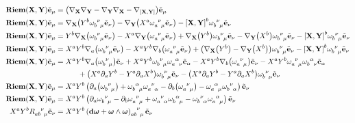 \begin{align*}
    \textbf{Riem}\qty(\vb X,\vb Y)\tilde{\vb e}_\mu&=\qty(\nabla_{\vb X}\nabla_{\vb Y}-\nabla_{\vb Y}\nabla_{\vb X}-\nabla_{\comm{\vb X}{\vb Y}})\tilde{\vb e}_\mu\\
    \textbf{Riem}\qty(\vb X,\vb Y)\tilde{\vb e}_\mu&=\nabla_{\vb X}\qty(Y^b\tensor{\omega}{_b^\nu_\mu}\tilde{\vb e}_\nu)-\nabla_{\vb Y}\qty(X^a\tensor{\omega}{_a^\nu_\mu}\tilde{\vb e}_\nu)-\comm{\vb X}{\vb Y}^b\tensor{\omega}{_b^\nu_\mu}\tilde{\vb e}_\nu\\
    \textbf{Riem}\qty(\vb X,\vb Y)\tilde{\vb e}_\mu&=Y^b\nabla_{\vb X}\qty(\tensor{\omega}{_b^\nu_\mu}\tilde{\vb e}_\nu)-X^a\nabla_{\vb Y}\qty(\tensor{\omega}{_a^\nu_\mu}\tilde{\vb e}_\nu)+\nabla_{\vb X}\qty(Y^b)\tensor{\omega}{_b^\nu_\mu}\tilde{\vb e}_\nu-\nabla_{\vb Y}\qty(X^b)\tensor{\omega}{_b^\nu_\mu}\tilde{\vb e}_\nu-\comm{\vb X}{\vb Y}^b\tensor{\omega}{_b^\nu_\mu}\tilde{\vb e}_\nu\\
    \textbf{Riem}\qty(\vb X,\vb Y)\tilde{\vb e}_\mu&=X^aY^b\nabla_{a}\qty(\tensor{\omega}{_b^\nu_\mu}\tilde{\vb e}_\nu)-X^aY^b\nabla_{b}\qty(\tensor{\omega}{_a^\nu_\mu}\tilde{\vb e}_\nu)+\qty(\nabla_{\vb X}\qty(Y^b)-\nabla_{\vb Y}\qty(X^b))\tensor{\omega}{_b^\nu_\mu}\tilde{\vb e}_\nu-\comm{\vb X}{\vb Y}^b\tensor{\omega}{_b^\nu_\mu}\tilde{\vb e}_\nu\\
    \textbf{Riem}\qty(\vb X,\vb Y)\tilde{\vb e}_\mu&=X^aY^b\nabla_{a}\qty(\tensor{\omega}{_b^\nu_\mu})\tilde{\vb e}_\nu+X^aY^b\tensor{\omega}{_b^\nu_\mu}\tensor{\omega}{_a^\alpha_\nu}\tilde{\vb e}_\alpha-X^aY^b\nabla_{b}\qty(\tensor{\omega}{_a^\nu_\mu})\tilde{\vb e}_\nu-X^aY^b\tensor{\omega}{_a^\nu_\mu}\tensor{\omega}{_b^\alpha_\nu}\tilde{\vb e}_\alpha\\
    &\quad\quad\quad+\qty(X^a\partial_a Y^b-Y^a\partial_aX^b)\tensor{\omega}{_b^\nu_\mu}\tilde{\vb e}_\nu-\qty(X^a\partial_aY^b-Y^a\partial_a X^b)\tensor{\omega}{_b^\nu_\mu}\tilde{\vb e}_\nu\\
    \textbf{Riem}\qty(\vb X,\vb Y)\tilde{\vb e}_\mu&=X^aY^b\left(\partial_{a}\qty(\tensor{\omega}{_b^\nu_\mu})+\tensor{\omega}{_b^\alpha_\mu}\tensor{\omega}{_a^\nu_\alpha}-\partial_{b}\qty(\tensor{\omega}{_a^\nu_\mu})-\tensor{\omega}{_a^\alpha_\mu}\tensor{\omega}{_b^\nu_\alpha}\right)\tilde{\vb e}_\nu\\
    \textbf{Riem}\qty(\vb X,\vb Y)\tilde{\vb e}_\mu&=X^aY^b\left(\partial_{a}\tensor{\omega}{_b^\nu_\mu}-\partial_{b}\tensor{\omega}{_a^\nu_\mu}+\tensor{\omega}{_a^\nu_\alpha}\tensor{\omega}{_b^\alpha_\mu}-\tensor{\omega}{_b^\nu_\alpha}\tensor{\omega}{_a^\alpha_\mu}\right)\tilde{\vb e}_\nu\\
    X^aY^b\tensor{R}{_a_b^\nu_\mu}\tilde{\vb e}_\nu&=X^aY^b\tensor{\left(\vb d{\boldsymbol\omega}+\boldsymbol\omega\wedge\boldsymbol\omega\right)}{_a_b^\nu_\mu}\tilde{\vb e}_\nu
\end{align*}

